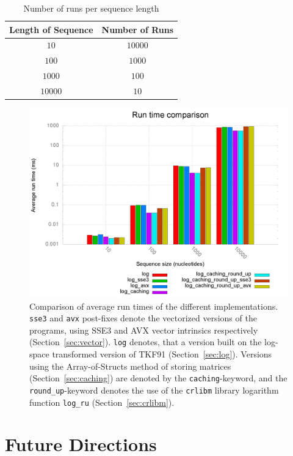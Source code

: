 \documentclass{article}
\begin{document}
\begin{table}
\centering

\begin{tabular}{|c|c|}
\hline 
Length of Sequence & Number of Runs \\ 
\hline 
$10$ & $10000$ \\ 
\hline 
$100$ & $1000$ \\ 
\hline 
$1000$ & $100$ \\ 
\hline 
$10000$ & $10$ \\ 
\hline 
\end{tabular}
\caption{Number of runs per sequence length}
\label{fig:runs}
\end{table}

\begin{figure}[h!]
\includegraphics[width=\textwidth]{images/benchplot.png}
    \caption{Comparison of average run times of the different implementations. \texttt{sse3} and \texttt{avx} post-fixes denote the vectorized versions of the programs, using SSE3 and AVX vector intrinsics respectively (Section~\ref{sec:vector}). \texttt{log} denotes, that a version built on the log-space transformed version of TKF91 (Section~\ref{sec:log}). Versions using the Array-of-Structs method of storing matrices (Section~\ref{sec:caching}) are denoted by the \texttt{caching}-keyword, and the \texttt{round\_up}-keyword denotes the use of the \texttt{crlibm} library logarithm function \texttt{log\_ru} (Section~\ref{sec:crlibm}).}
\label{fig:runtime}
\end{figure}

\newpage

\section{Future Directions}
\end{document}
